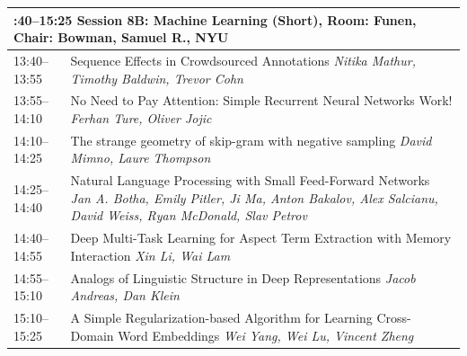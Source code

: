 \documentclass{book}
\renewcommand{\large}{\fontsize{36}{40}\selectfont}
\begin{document}
\begin{tabular}{p{3in}p{16in}}
  \multicolumn{2}{p{\textwidth}}{\bfseries\large 13:40--15:25 Session 8B: Machine Learning (Short), Room:  Funen, Chair:  Bowman, Samuel R., NYU} \\\hline

    
    13:40--13:55
    &	Sequence Effects in Crowdsourced Annotations \newline 
    {\itshape Nitika Mathur, Timothy Baldwin, Trevor Cohn} \\
    
    13:55--14:10
    &	No Need to Pay Attention: Simple Recurrent Neural Networks Work! \newline 
    {\itshape Ferhan Ture, Oliver Jojic} \\
    
    14:10--14:25
    &	The strange geometry of skip-gram with negative sampling \newline 
    {\itshape David Mimno, Laure Thompson} \\
    
    14:25--14:40
    &	Natural Language Processing with Small Feed-Forward Networks \newline 
    {\itshape Jan A. Botha, Emily Pitler, Ji Ma, Anton Bakalov, Alex Salcianu, David Weiss, Ryan McDonald, Slav Petrov} \\
    
    14:40--14:55
    &	Deep Multi-Task Learning for Aspect Term Extraction with Memory Interaction \newline 
    {\itshape Xin Li, Wai Lam} \\
    
    14:55--15:10
    &	Analogs of Linguistic Structure in Deep Representations \newline 
    {\itshape Jacob Andreas, Dan Klein} \\
    
    15:10--15:25
    &	A Simple Regularization-based Algorithm for Learning Cross-Domain Word Embeddings \newline 
    {\itshape Wei Yang, Wei Lu, Vincent Zheng} \\
    
\end{tabular}
\end{document}
